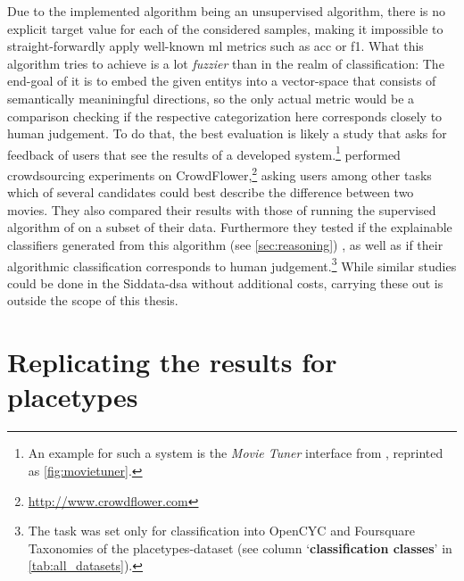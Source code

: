 Due to the implemented algorithm being an \gls{unsupervised} algorithm, there is no explicit target value for each of the considered samples, making it impossible to straight-forwardly apply well-known \gls{ml} metrics such as \Gls{acc} or \gls{f1}. What this algorithm tries to achieve is a lot \textit{fuzzier} than in the realm of classification: The end-goal of it is to embed the given \glspl{entity} into a vector-space that consists of semantically meaniningful directions, so the only actual metric would be a comparison checking if the respective categorization here corresponds closely to human judgement. To do that, the best evaluation is likely a study that asks for feedback of users that see the results of a developed system.\footnote{An example for such a system is the \textit{Movie Tuner} interface from \textcite{VISR12}, reprinted as \autoref{fig:movietuner}.} \textcite{Derrac2015} performed crowdsourcing experiments on CrowdFlower,\footnote{\url{http://www.crowdflower.com}} asking users among other tasks which of several candidates could best describe the difference between two movies. They also compared their results with those of running the supervised algorithm of \cite{VISR12} on a subset of their data. Furthermore they tested if the explainable classifiers generated from this algorithm (see \autoref{sec:reasoning})  \cite[48]{Derrac2015}, as well as if their algorithmic classification corresponds to human judgement.\footnote{The task was set only for classification into OpenCYC and Foursquare Taxonomies of the placetypes-dataset (see column `\textbf{classification classes}' in \autoref{tab:all_datasets}).} 
While similar studies could be done in the Siddata-\gls{dsa} \cite{Schurz2021} without additional costs, carrying these out is outside the scope of this thesis.



\section{Replicating the results for placetypes}
\label{sec:results_placetypes}

